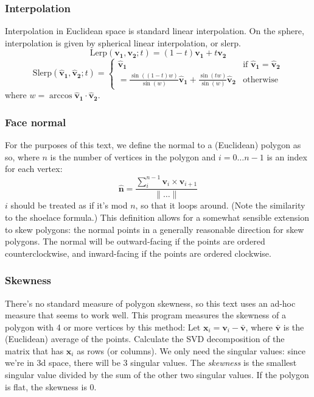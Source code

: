 \documentclass{amsart}[12pt]
\begin{document}
\subsubsection{Interpolation}
Interpolation in Euclidean space is standard linear interpolation. On the
sphere, interpolation is given by spherical linear interpolation, or slerp.
\begin{equation}
\mathrm{Lerp}(\mathbf{v_1}, \mathbf{v_2}; t) =
       (1-t) \mathbf{v_1} + t \mathbf{v_2}
\end{equation}
\begin{equation}
\mathrm{Slerp}(\mathbf{\hat{v}_1}, \mathbf{\hat{v}_2}; t) =
\begin{cases}\mathbf{\hat{v}_1}
  & \text{if } \mathbf{\hat{v}_1} = \mathbf{\hat{v}_2}\\
       = \frac{\sin {((1-t)w)}}{\sin (w)} \mathbf{\hat{v}_1} +
       \frac{\sin (tw)}{\sin (w)} \mathbf{\hat{v}_2}
  &\text{otherwise}
      \end{cases}
\end{equation}
where $w = \arccos \mathbf{\hat{v}_1} \cdot \mathbf{\hat{v}_2}$.

\subsubsection{Face normal}
For the purposes of this text, we define the normal to a (Euclidean) polygon as
so, where $n$ is the number of vertices in the polygon and
$i = 0 \dots n-1$ is an index for each vertex:
\begin{equation}
  \hat{\mathbf{n}} =
  \frac{\sum^{n-1}_i \mathbf{v}_i \times \mathbf{v}_{i+1}}{\|\dots\|}
\end{equation}
$i$ should be treated as if it's mod $n$, so that it loops around.
(Note the similarity to the shoelace formula.)
This definition allows for a somewhat sensible extension to skew polygons:
the normal points in a generally reasonable direction for skew polygons.
The normal will be outward-facing if the points are ordered counterclockwise,
and inward-facing if the points are ordered clockwise.

\subsubsection{Skewness}
There's no standard measure of polygon skewness, so this text uses an ad-hoc
measure that seems to work well. This program measures the skewness of a polygon
with 4 or more vertices by this method: Let $\mathbf x_i = \mathbf{v}_i -
\bar{\mathbf{v}}$, where $\bar{\mathbf{v}}$ is the (Euclidean) average of the
points. Calculate the SVD decomposition of the matrix that has $\mathbf x_i$
as rows (or columns). We only need the singular values: since we're in 3d
space, there will be 3 singular values. The \textit{skewness} is the smallest
singular value divided by the sum of the  other two singular values.
If the polygon is flat, the skewness is 0.
\end{document}
